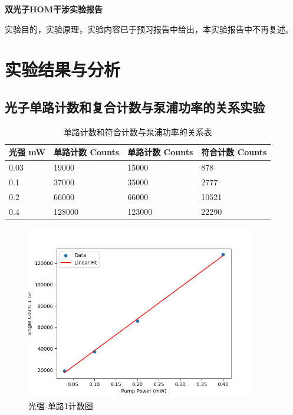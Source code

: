 \documentclass[a4paper,UTF8]{ctexart}
\begin{document}
\begin{center}
    \textbf{\Large 双光子HOM干涉实验报告}
    \par {}
\end{center}

实验目的，实验原理，实验内容已于预习报告中给出，本实验报告中不再复述。

\section{实验结果与分析}

\subsection{光子单路计数和复合计数与泵浦功率的关系实验}

\begin{table}[H]
    \centering
    \caption{单路计数和符合计数与泵浦功率的关系表}
    \begin{tabular}{|l|l|l|l|}
    \hline
        光强 mW & 单路计数 Counts & 单路计数 Counts & 符合计数 Counts \\ \hline
        0.03 & 19000 & 15000 & 878 \\ \hline
        0.1 & 37000 & 35000 & 2777 \\ \hline
        0.2 & 66000 & 66000 & 10521 \\ \hline
        0.4 & 128000 & 123000 & 22290 \\ \hline
    \end{tabular}
\end{table}

\begin{figure}[H]
    \centering
    \begin{minipage}[b]{0.9\textwidth}
        \centering
        \includegraphics[width=0.9\textwidth]{./ffig1.png}
        \caption{光强-单路1计数图}
    \end{minipage}
\end{figure}
\end{document}
